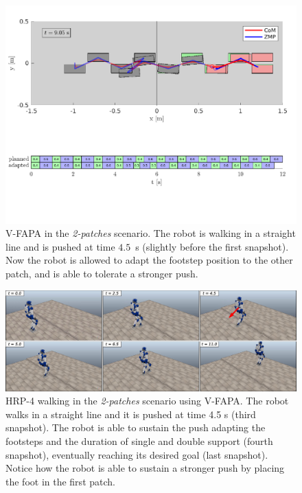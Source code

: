 \begin{figure}
    \includegraphics[trim={0 2.2cm 0 8.6cm},clip,width=\textwidth]{figures/two-patches-mixed-integer-completing-task.pdf}
    \caption{V-FAPA in the {\em 2-patches} scenario. The robot is walking
        in a straight line and is pushed at time $4.5$~s (slightly before the
        first snapshot). Now the robot is allowed to adapt the footstep position
        to the other patch, and is able to tolerate a stronger push.
    }
    \label{fig:FAPA:matlab_2pacmi}
\end{figure}

\begin{figure}
    \centering
    \includegraphics[width=\textwidth]{figures/two-patches-push-mixed-integer-snapshots.jpeg}
    \caption{HRP-4 walking in the \textit{2-patches} scenario using V-FAPA.
        The robot walks in a straight line and it is pushed at time 4.5 s
        (third snapshot). The robot is able to sustain the push adapting the
        footsteps and the duration of single and double support (fourth
        snapshot), eventually reaching its desired goal (last snapshot).
        Notice how the robot is able to sustain a stronger push by placing
        the foot in the first patch.
    }
    \label{fig:FAPA:sim3:snapshots}
\end{figure}

